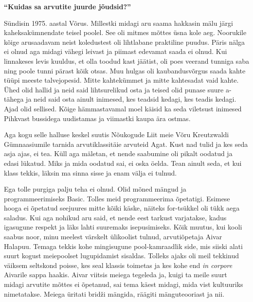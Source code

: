 
\textbf{\enquote{Kuidas sa arvutite juurde jõudsid?}}

Sündisin 1975. aastal Võrus. Millestki midagi aru saama hakkasin mälu järgi kaheksakümnendate teisel poolel. See oli mitmes mõttes üsna kole aeg. Noorukile kõige arusaadavam neist koledustest oli lihtlabane praktiline puudus. Päris nälga ei olnud aga midagi vähegi leivast ja piimast edevamat saada ei olnud. Kui linnakeses levis kuuldus, et olla toodud kast jäätist, oli poes veerand tunniga saba ning poole tunni pärast kõik otsas. Muu hulgas oli kaubandusvõrgus saada kahte tüüpi meeste talvejopesid. Mitte kahtekümmet ja mitte kahtesadat vaid kahte. Ühed olid hallid ja neid said lihtsurelikud osta ja teised olid punase suure a-tähega ja neid said osta ainult inimesed, kes teadsid kedagi, kes teadis kedagi. Ajad olid sellised. Kõige hämmastavamal moel käisid ka seda viletsust inimesed Pihkvast bussidega uudistamas ja viimastki kaupa ära ostmas. 

Aga kogu selle halluse keskel suutis Nõukogude Liit meie Võru Kreutzwaldi Gümnaasiumile tarnida arvutiklassitäie arvuteid Agat. Kust nad tulid ja kes seda asja ajas, ei tea. Küll aga mäletan, et nende saabumine oli pikalt oodatud ja edasi lükatud. Miks ja mida oodatud sai, ei oska öelda. Tean ainult seda, et kui klass tekkis, läksin ma sinna sisse ja enam välja ei tulnud. 

Ega tolle purgiga palju teha ei olnud. Olid mõned mängud ja programmeerimiseks Basic. Tolles meid programmeerima õpetatigi. Esimese hooga ei õpetatud seejuures mitte kõiki käske, näiteks for-tsükkel oli tükk aega saladus. Kui aga nohikud aru said, et nende eest tarkust varjatakse, kadus igasugune respekt ja läks lahti suuremaks isepusimiseks. Kõik muutus, kui kooli saabus noor, minu meelest värskelt ülikoolist tulnud, arvutiõpetaja Aivar Halapuu. Temaga tekkis kohe mingisugune pool-kamraadlik side, mis siiski alati suurt kogust meiepoolset lugupidamist sisaldas. Tolleks ajaks oli meil tekkinud väiksem seltskond poisse, kes seal klassis toimetas ja kes kohe end \emph{in corpore} Aivarile sappa haakis. Aivar viitsis meiega tegeleda ja, kuigi ta meile suurt midagi arvutite mõttes ei õpetanud, sai tema käest midagi, mida vist kultuuriks nimetatakse. Meiega üritati bridži mängida, räägiti mänguteooriast ja nii. 

